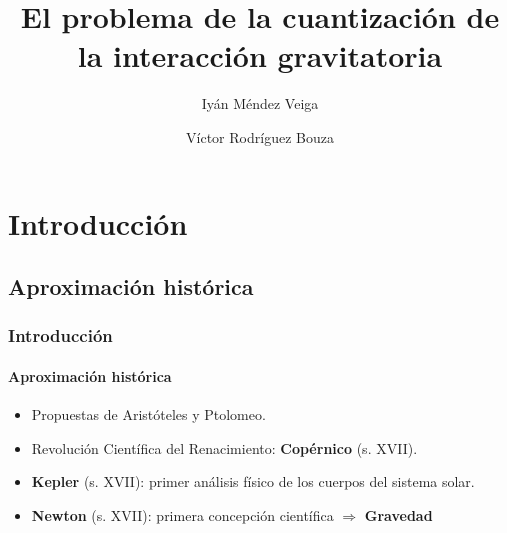 \documentclass{beamer}
\title{El problema de la cuantización de la interacción gravitatoria}
\author{Iyán Méndez Veiga \and Víctor Rodríguez Bouza}
\date[TRG 2014/2015]
\begin{document}
\maketitle

\section{Introducción}
\subsection{Aproximación histórica}
\begin{frame}
\frametitle{Introducción}
\framesubtitle{Aproximación histórica}
\begin{itemize}
 \item Propuestas de Aristóteles y Ptolomeo.
 \item Revolución Científica del Renacimiento: \textbf{Copérnico} (s. XVII).
 \item \textbf{Kepler} (s. XVII): primer análisis físico de los cuerpos del sistema solar.
 \item \textbf{Newton} (s. XVII): primera concepción científica $\Rightarrow$ \textbf{Gravedad}
\end{itemize}
\end{frame}
\end{document}
